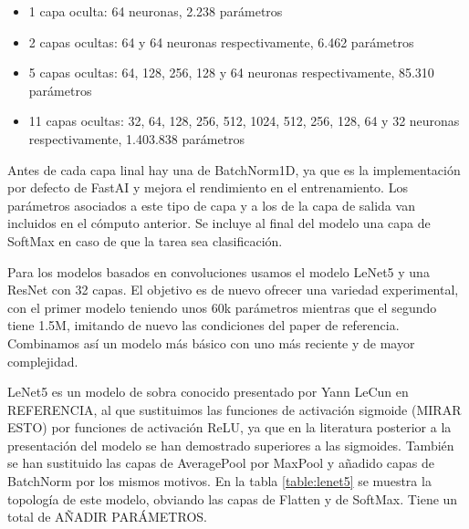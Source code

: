 \begin{itemize}

	\item{1 capa oculta}: 64 neuronas, 2.238 parámetros

	\item{2 capas ocultas}: 64 y 64 neuronas respectivamente, 6.462 parámetros

	\item{5 capas ocultas}: 64, 128, 256, 128 y 64 neuronas respectivamente, 85.310 parámetros

	\item{11 capas ocultas}: 32, 64, 128, 256, 512, 1024, 512, 256, 128, 64 y 32 neuronas respectivamente, 1.403.838 parámetros

\end{itemize}

Antes de cada capa linal hay una de BatchNorm1D, ya que es la implementación por defecto de FastAI y mejora el rendimiento en el entrenamiento. Los parámetros asociados a este tipo de capa y a los de la capa de salida van incluidos en el cómputo anterior. Se incluye al final del modelo una capa de SoftMax en caso de que la tarea sea clasificación.

Para los modelos basados en convoluciones usamos el modelo LeNet5 y una ResNet con 32 capas. El objetivo es de nuevo ofrecer una variedad experimental, con el primer modelo teniendo unos 60k parámetros mientras que el segundo tiene 1.5M, imitando de nuevo las condiciones del paper de referencia. Combinamos así un modelo más básico con uno más reciente y de mayor complejidad.


LeNet5 es un modelo de sobra conocido presentado por Yann LeCun en REFERENCIA, al que sustituimos las funciones de activación sigmoide (MIRAR ESTO) por funciones de activación ReLU, ya que en la literatura posterior a la presentación del modelo se han demostrado superiores a las sigmoides. También se han sustituido las capas de AveragePool por MaxPool y añadido capas de BatchNorm por los mismos motivos. En la tabla \ref{table:lenet5} se muestra la topología de este modelo, obviando las capas de Flatten y de SoftMax. Tiene un total de AÑADIR PARÁMETROS.


